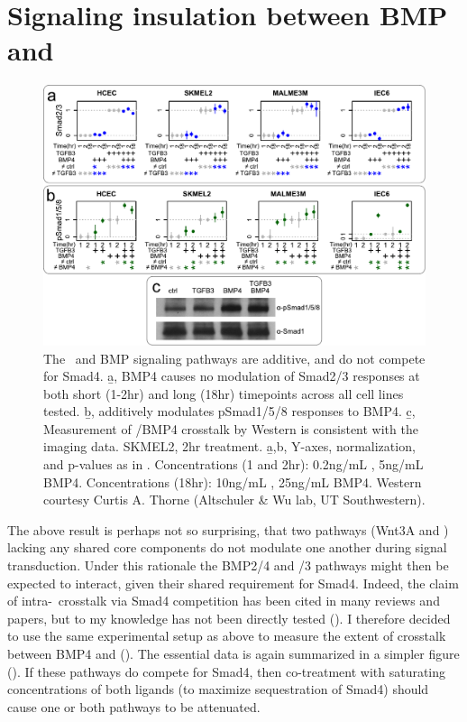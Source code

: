 \section{Signaling insulation between BMP and \tgf}
\label{insulation:bmpTgfb}


 
  \begin{figure}[!bt]
  \centering
  \includegraphics[width=6.5in]{FIGS/insulation/bmpTgfbInsulation.pdf}
  {\singlespacing 
  \caption[BMP4 and \tgf\ do not compete for Smad4 (all data).]
        { The \tgf\ and BMP signaling pathways are additive,
          and do not compete for Smad4. \b{a}, BMP4 causes no
          modulation of Smad2/3 responses at
          both short (1-2hr) and long (18hr) timepoints across all
          cell lines tested. \b{b},  additively modulates pSmad1/5/8
          responses to BMP4. \b{c}, Measurement of /BMP4 crosstalk by
          Western is consistent with the imaging data. SKMEL2, 2hr treatment.
          \b{a,b}, Y-axes, normalization, and
          p-values as in . 
          Concentrations (1 and 2hr): 0.2ng/mL , 5ng/mL BMP4. Concentrations (18hr): 10ng/mL , 25ng/mL BMP4.
          Western courtesy Curtis A. Thorne (Altschuler \& Wu lab, UT
          Southwestern).
          }
  \label{fig:insulation:bmpTgfbInsulation}}
  \end{figure}



The above result is perhaps not so surprising,
that two pathways (Wnt3A and ) lacking any shared core components do
not modulate one another during signal transduction. 
Under this rationale the BMP2/4 and /3 pathways
might then be expected to interact, given their shared requirement
for Smad4. Indeed, the claim of intra-\tgfbsf\ crosstalk 
via Smad4 competition has been cited in many reviews and papers,
but to my knowledge has not been directly tested
(). I therefore
decided to use the same experimental setup as above to measure
the extent of crosstalk between BMP4 and 
(). The essential data is
again summarized in a simpler figure
(). If these pathways do 
compete for Smad4, then co-treatment with saturating concentrations
of both ligands (to maximize sequestration of Smad4) should cause one or
both pathways to be attenuated.

